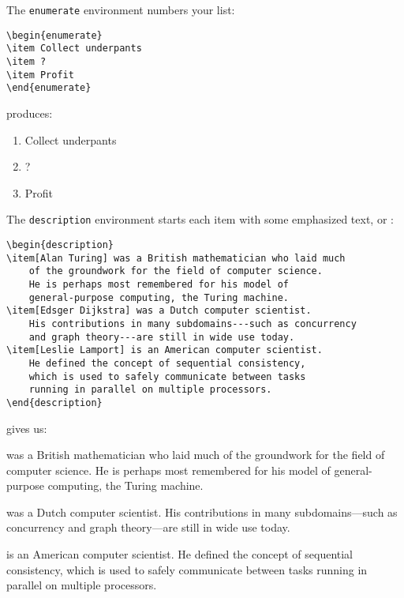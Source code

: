 \bigskip
\noindent The \texttt{enumerate} environment numbers your list:
\begin{leftfigure}
\begin{lstlisting}
\begin{enumerate}
\item Collect underpants
\item ?
\item Profit
\end{enumerate}
\end{lstlisting}
\end{leftfigure}
produces:
\begin{leftfigure}
\lm%
\begin{enumerate}[leftmargin=*]
\item Collect underpants
\item ?
\item Profit
\end{enumerate}
\end{leftfigure}

\bigskip
\noindent The \texttt{description} environment starts each item with some
emphasized text, or :
\begin{leftfigure}
\begin{lstlisting}
\begin{description}
\item[Alan Turing] was a British mathematician who laid much
    of the groundwork for the field of computer science.
    He is perhaps most remembered for his model of
    general-purpose computing, the Turing machine.
\item[Edsger Dijkstra] was a Dutch computer scientist.
    His contributions in many subdomains---such as concurrency
    and graph theory---are still in wide use today.
\item[Leslie Lamport] is an American computer scientist.
    He defined the concept of sequential consistency,
    which is used to safely communicate between tasks
    running in parallel on multiple processors.
\end{description}
\end{lstlisting}
\end{leftfigure}
gives us:
\begin{leftfigure}
\begin{minipage}{0.8\textwidth}
\lm%
\begin{description}[leftmargin=*]
\item[Alan Turing] was a British mathematician who laid much
    of the groundwork for the field of computer science.
    He is perhaps most remembered for his model of
    general-purpose computing, the Turing machine.
\item[Edsger Dijkstra] was a Dutch computer scientist.
    His contributions in many subdomains---such as concurrency
    and graph theory---are still in wide use today.
\item[Leslie Lamport] is an American computer scientist.
    He defined the concept of sequential consistency,
    which is used to safely communicate between tasks
    running in parallel on multiple processors.
\end{description}
\end{minipage}
\end{leftfigure}

